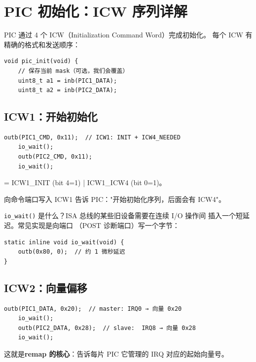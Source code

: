 \section{PIC 初始化：ICW 序列详解}

PIC 通过 4 个 ICW（Initialization Command Word）完成初始化。
每个 ICW 有精确的格式和发送顺序：

\begin{lstlisting}[style=cstyle]
void pic_init(void) {
    // 保存当前 mask（可选，我们会覆盖）
    uint8_t a1 = inb(PIC1_DATA);
    uint8_t a2 = inb(PIC2_DATA);
\end{lstlisting}

\subsection{ICW1：开始初始化}

\begin{lstlisting}[style=cstyle]
    outb(PIC1_CMD, 0x11);  // ICW1: INIT + ICW4_NEEDED
    io_wait();
    outb(PIC2_CMD, 0x11);
    io_wait();
\end{lstlisting}

 = ICW1\_INIT (bit 4=1) | ICW1\_ICW4 (bit 0=1)。

向命令端口写入 ICW1 告诉 PIC："开始初始化序列，后面会有 ICW4"。

\begin{whybox}
\texttt{io\_wait()} 是什么？ISA 总线的某些旧设备需要在连续 I/O 操作间
插入一个短延迟。常见实现是向端口 （POST 诊断端口）写一个字节：

\begin{lstlisting}[style=cstyle]
static inline void io_wait(void) {
    outb(0x80, 0);  // 约 1 微秒延迟
}
\end{lstlisting}
\end{whybox}

\subsection{ICW2：向量偏移}

\begin{lstlisting}[style=cstyle]
    outb(PIC1_DATA, 0x20);  // master: IRQ0 → 向量 0x20
    io_wait();
    outb(PIC2_DATA, 0x28);  // slave:  IRQ8 → 向量 0x28
    io_wait();
\end{lstlisting}

这就是\textbf{remap 的核心}：告诉每片 PIC 它管理的 IRQ 对应的起始向量号。

